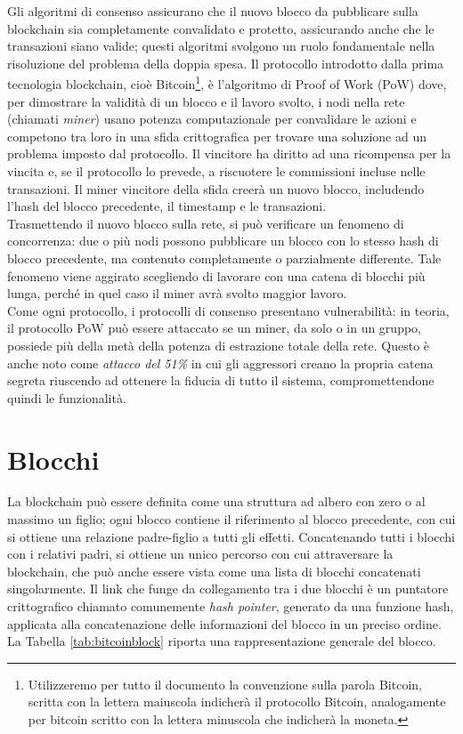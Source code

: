 Gli algoritmi di consenso assicurano che il nuovo blocco da pubblicare sulla blockchain sia completamente convalidato e protetto, assicurando anche che le transazioni siano valide; questi algoritmi svolgono un ruolo fondamentale nella risoluzione del problema della doppia spesa.
Il protocollo introdotto dalla prima tecnologia blockchain, cioè Bitcoin\footnote{Utilizzeremo per tutto il documento la convenzione sulla parola Bitcoin, scritta con la lettera maiuscola indicherà il protocollo Bitcoin, analogamente per bitcoin scritto con la lettera minuscola che indicherà la moneta.}, è l’algoritmo di  Proof of Work (PoW) dove, per dimostrare la validità di un blocco e il lavoro svolto, i nodi nella rete (chiamati {\it miner\/}) usano potenza computazionale per convalidare le azioni e competono tra loro in una sfida crittografica per trovare una soluzione ad un problema imposto dal protocollo.
Il vincitore ha diritto ad una ricompensa per la vincita e, se il protocollo lo prevede, a riscuotere le commissioni incluse nelle transazioni.
Il miner vincitore della sfida creerà un nuovo blocco, includendo l’hash del blocco precedente, il timestamp e le transazioni. \\
Trasmettendo il nuovo blocco sulla rete, si può verificare un fenomeno di concorrenza: due o più nodi possono pubblicare un blocco con lo stesso hash di blocco precedente, ma contenuto completamente o parzialmente differente. Tale fenomeno viene aggirato scegliendo di lavorare con una catena di blocchi più lunga, perché in quel caso il miner avrà svolto maggior lavoro. \\
Come ogni protocollo, i protocolli di consenso presentano vulnerabilità: in teoria, il protocollo PoW può essere attaccato se un miner, da solo o in un gruppo, possiede più della metà della potenza di estrazione totale della rete. Questo è anche noto come \emph{attacco del 51\%} in cui gli aggressori creano la propria catena segreta riuscendo ad ottenere la fiducia di tutto il sistema, compromettendone quindi le funzionalità.


\section{Blocchi}
\label{sec:blocchiBlockchain}

La blockchain può essere definita come una struttura ad albero con zero o al massimo un figlio; ogni blocco contiene il riferimento al blocco precedente, con cui si ottiene una relazione padre-figlio a tutti gli effetti.
Concatenando tutti i blocchi con i relativi padri, si ottiene un unico percorso con cui attraversare la blockchain, che può anche essere vista come una lista di blocchi concatenati singolarmente.
Il link che funge da collegamento tra i due blocchi è un puntatore crittografico chiamato comunemente {\it hash pointer\/}, generato da una funzione hash, applicata alla concatenazione delle informazioni del blocco in un preciso ordine. La Tabella \ref{tab:bitcoinblock} riporta una rappresentazione generale del blocco.


